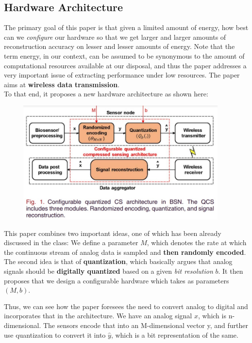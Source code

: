 \documentclass[a4paper,11pt]{article}
\numberwithin{definition}{section}
\numberwithin{mytheorem}{subsection}
\begin{document}
\subsection{Hardware Architecture}
The primary goal of this paper is that given a limited amount of energy, how best can we \emph{configure} our hardware so that we get larger and larger amounts of reconstruction accuracy on lesser and lesser amounts of energy. Note that the term energy, in our context, can be assumed to be synonymous to the amount of computational resources available at our disposal, and thus the paper addresses a very important issue of extracting performance under low resources. The paper aims at \textbf{wireless data transmission}.\\
To that end, it proposes a new hardware architecture as shown here:
\begin{center}
    \begin{figure}[!h]
        \includegraphics[width=400px]{Proposed Hardware architecture.jpeg}
    \end{figure}
\end{center}
This paper combines two important ideas, one of which has been already discussed in the class: We define a parameter $M$, which denotes the rate at which the continuous stream of analog data is sampled and \textbf{then randomly encoded}. The second idea is that of \textbf{quantization}, which basically argues that analog signals should be \textbf{digitally quantized} based on a given \emph{bit resolution} $b$. It then proposes that we design a configurable hardware which takes as parameters $(M,b)$.

Thus, we can see how the paper foresees the need to convert analog to digital and incorporates that in the architecture.
We have an analog signal $x$, which is n-dimensional. The sensors encode that into an M-dimensional vector y, and further use quantization to convert it into $\hat{y}$, which is a bit representation of the same.
\end{document}
